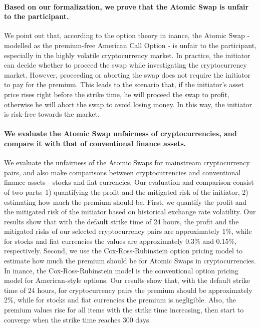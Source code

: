 \paragraph{Based on our formalization, we prove that the Atomic Swap is unfair to the participant.}
We point out that, according to the option theory in inance, the Atomic Swap - modelled as the premium-free American Call Option - is unfair to the participant, especially in the highly volatile cryptocurrency market.
In practice, the initiator can decide whether to proceed the swap while investigating the cryptocurrency market.
However, proceeding or aborting the swap does not require the initiator to pay for the premium.
This leads to the scenario that, if the initiator's asset price rises right before the strike time, he will proceed the swap to profit, otherwise he will abort the swap to avoid losing money.
In this way, the initiator is risk-free towards the market.

\paragraph{We evaluate the Atomic Swap unfairness of cryptocurrencies, and compare it with that of conventional finance assets.}
We evaluate the unfairness of the Atomic Swaps for mainstream cryptocurrency pairs, and also make comparisons between cryptocurrencies and conventional finance assets - stocks and fiat currencies.
Our evaluation and comparison consist of two parts: 1) quantifying the profit and the mitigated risk of the initiator, 2) estimating how much the premium should be.
First, we quantify the profit and the mitigated risk of the initiator based on historical exchange rate volatility.
Our results show that with the default strike time of 24 hours, the profit and the mitigated risks of our selected cryptocurrency pairs are approximately 1\%, while for stocks and fiat currencies the values are approximately 0.3\% and 0.15\%, respectively.
Second, we use the Cox-Ross-Rubinstein option pricing model to estimate how much the premium should be for Atomic Swaps in cryptocurrencies.
In inance, the Cox-Ross-Rubinstein model is the conventional option pricing model for American-style options.
Our results show that, with the default strike time of 24 hours, for cryptocurrency pairs the premium should be approximately 2\%, while for stocks and fiat currencies the premium is negligible.
Also, the premium values rise for all items with the strike time increasing, then start to converge when the strike time reaches 300 days.

